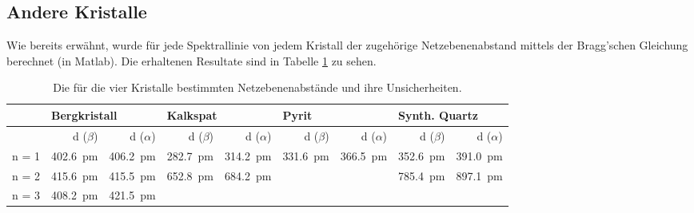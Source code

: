 \subsection{Andere Kristalle}
\label{subsec:error:othercrystals}


Wie   bereits   erw\"ahnt,   wurde   f\"ur  jede   Spektrallinie   von   jedem
Kristall   der   zugeh\"orige   Netzebenenabstand  mittels   der   Bragg'schen
Gleichung  berechnet (in  Matlab). Die  erhaltenen Resultate  sind in  Tabelle
\ref{tab:results:spektra:otherCrystals} zu sehen.

\begin{table}[h!]
    \centering
    \small
    \caption{%
        Die f\"ur die vier Kristalle bestimmten Netzebenenabst\"ande und ihre
		Unsicherheiten.
    }
    \label{tab:results:spektra:otherCrystals}
    \begin{tabular}{lrrrrrrrr}
        \toprule
        &
        \multicolumn{2}{l}{Bergkristall}         &
        \multicolumn{2}{l}{Kalkspat}             &
        \multicolumn{2}{l}{Pyrit}                &
        \multicolumn{2}{l}{Synth. Quartz} \\
        \midrule

        &
        d ($\beta$)  &
        d ($\alpha$) &
        d ($\beta$)  &
        d ($\alpha$) &
        d ($\beta$)  &
        d ($\alpha$) &
        d ($\beta$)  &
        d ($\alpha$) \\

        \midrule


        n = 1              &
        \SI{402.6}{\pico\meter} &
        \SI{406.2}{\pico\meter} &
        \SI{282.7}{\pico\meter} &
        \SI{314.2}{\pico\meter} &
        \SI{331.6}{\pico\meter} &
        \SI{366.5}{\pico\meter} &
        \SI{352.6}{\pico\meter} &
        \SI{391.0}{\pico\meter} \\


        n = 2                   &
        \SI{415.6}{\pico\meter} & %
        \SI{415.5}{\pico\meter} & %
        \SI{652.8}{\pico\meter} & %
        \SI{684.2}{\pico\meter} & %
                                &
                                &
        \SI{785.4}{\pico\meter} & %
        \SI{897.1}{\pico\meter} \\ %

        n = 3                   &
        \SI{408.2}{\pico\meter} & %
        \SI{421.5}{\pico\meter} & %
                                &
                                &
                                &
                                &
                                &
                                \\


\end{tabular}
\end{table}
